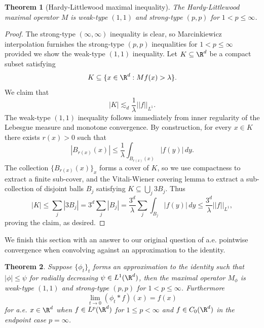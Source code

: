 \documentclass[reqno]{amsart}
\newtheorem{theorem}{Theorem}
\theoremstyle{definition}
\theoremstyle{remark}
\begin{document}
\begin{theorem}[Hardy-Littlewood maximal inequality]
	The Hardy-Littlewood maximal operator $M$ is weak-type $(1, 1)$ and strong-type $(p, p)$ for $1 < p \leq \infty$. 
\end{theorem}

\begin{proof}
	The strong-type $(\infty, \infty)$ inequality is clear, so Marcinkiewicz interpolation furnishes the strong-type $(p, p)$ inequalities for $1 < p \leq \infty$ provided we show the weak-type $(1, 1)$ inequality. Let $K \subseteq \R^d$ be a compact subset satisfying
		\[ K \subseteq \{ x \in \R^d : Mf(x) > \lambda \}. \]
	We claim that 
		\[ |K| \lesssim_d \frac1\lambda ||f||_{L^1}. \]
	The weak-type $(1, 1)$ inequality follows immediately from inner regularity of the Lebesgue measure and monotone convergence. By construction, for every $x \in K$ there exists $r(x) > 0$ such that 
		\[ |B_{r(x)} (x)| \leq \frac1\lambda \int_{B_{r(x)} (x)} |f(y)| \, dy.\]
	The collection $\{B_{r(x)} (x)\}_x$ forms	a cover of $K$, so we use compactness to extract a finite sub-cover, and the Vitali-Wiener covering lemma to extract a sub-collection of disjoint balls $B_j$ satisfying $K \subseteq \bigcup_j 3B_j$. Thus
		\[ |K| \leq \sum_j |3B_j| = 3^d \sum_j |B_j| = \frac{3^d}{\lambda} \sum_j \int_{B_j} |f(y)| \, dy \leq \frac{3^d}{\lambda} ||f||_{L^1}, \]
	proving the claim, as desired. 
\end{proof}

We finish this section with an answer to our original question of a.e. pointwise convergence when convolving against an approximation to the identity. 

\begin{theorem}
	Suppose $\{ \phi_t \}_t$ forms an approximation to the identity such that $|\phi| \leq \psi$ for radially decreasing $\psi \in L^1 (\R^d)$, then the maximal operator $M_\phi$ is weak-type $(1, 1)$ and strong-type $(p, p)$ for $1 < p \leq \infty$. Furthermore
		\[ \lim_{t \to 0} (\phi_t * f) (x) = f(x) \]
	for a.e. $x \in \R^d$ when $f \in L^p (\R^d)$ for $1 \leq p < \infty$ and $f \in C_0 (\R^d)$ in the endpoint case $p = \infty$. 
\end{theorem}
\end{document}
